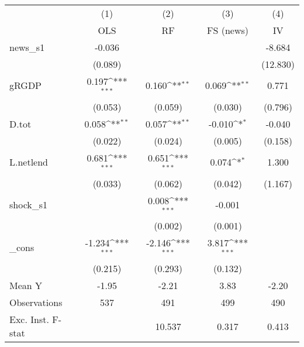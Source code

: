 {
\def\sym#1{\ifmmode^{#1}\else\(^{#1}\)\fi}
\begin{tabular}{l*{4}{c}}
\toprule
            &\multicolumn{1}{c}{(1)}&\multicolumn{1}{c}{(2)}&\multicolumn{1}{c}{(3)}&\multicolumn{1}{c}{(4)}\\
            &\multicolumn{1}{c}{OLS}&\multicolumn{1}{c}{RF}&\multicolumn{1}{c}{FS (news)}&\multicolumn{1}{c}{IV}\\
\midrule
news\_s1     &      -0.036         &                     &                     &      -8.684         \\
            &     (0.089)         &                     &                     &    (12.830)         \\
\addlinespace
gRGDP       &       0.197\sym{***}&       0.160\sym{**} &       0.069\sym{**} &       0.771         \\
            &     (0.053)         &     (0.059)         &     (0.030)         &     (0.796)         \\
\addlinespace
D.tot       &       0.058\sym{**} &       0.057\sym{**} &      -0.010\sym{*}  &      -0.040         \\
            &     (0.022)         &     (0.024)         &     (0.005)         &     (0.158)         \\
\addlinespace
L.netlend   &       0.681\sym{***}&       0.651\sym{***}&       0.074\sym{*}  &       1.300         \\
            &     (0.033)         &     (0.062)         &     (0.042)         &     (1.167)         \\
\addlinespace
shock\_s1    &                     &       0.008\sym{***}&      -0.001         &                     \\
            &                     &     (0.002)         &     (0.001)         &                     \\
\addlinespace
\_cons      &      -1.234\sym{***}&      -2.146\sym{***}&       3.817\sym{***}&                     \\
            &     (0.215)         &     (0.293)         &     (0.132)         &                     \\
\midrule
Mean Y      &       -1.95         &       -2.21         &        3.83         &       -2.20         \\
Observations&         537         &         491         &         499         &         490         \\
Exc. Inst. F-stat&                     &      10.537         &       0.317         &       0.413         \\
\bottomrule
\end{tabular}
}
